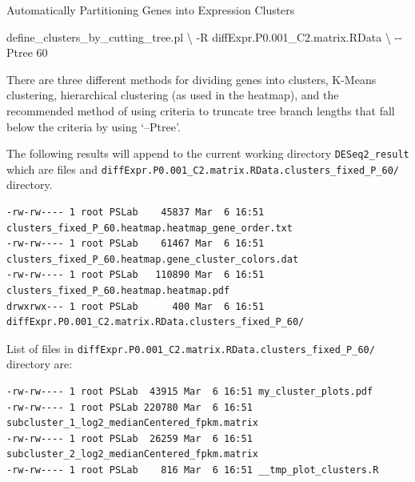 \documentclass[
  letterpaper,
  DIV=11,
  numbers=noendperiod]{scrreprt}
\newenvironment{Shaded}{\begin{snugshade}}{\end{snugshade}}
\newcommand{\DataTypeTok}[1]{\textcolor[rgb]{0.68,0.00,0.00}{#1}}
\newcommand{\ExtensionTok}[1]{\textcolor[rgb]{0.00,0.23,0.31}{#1}}
\newcommand{\NormalTok}[1]{\textcolor[rgb]{0.00,0.23,0.31}{#1}}
\begin{document}
\begin{tcolorbox}[enhanced jigsaw, breakable, bottomrule=.15mm, left=2mm, coltitle=black, opacityback=0, colframe=quarto-callout-note-color-frame, toprule=.15mm, opacitybacktitle=0.6, colbacktitle=quarto-callout-note-color!10!white, bottomtitle=1mm, colback=white, toptitle=1mm, titlerule=0mm, rightrule=.15mm, arc=.35mm, title=\textcolor{quarto-callout-note-color}{\faInfo}\hspace{0.5em}{Activity}, leftrule=.75mm]

Automatically Partitioning Genes into Expression Clusters

\begin{Shaded}
\begin{Highlighting}[]
\ExtensionTok{define\_clusters\_by\_cutting\_tree.pl} \DataTypeTok{\textbackslash{}}
\NormalTok{{-}R diffExpr.P0.001\_C2.matrix.RData }\DataTypeTok{\textbackslash{}}
\NormalTok{{-}{-}Ptree 60}
\end{Highlighting}
\end{Shaded}

\end{tcolorbox}

There are three different methods for dividing genes into clusters,
K-Means clustering, hierarchical clustering (as used in the heatmap),
and the recommended method of using criteria to truncate tree branch
lengths that fall below the criteria by using `--Ptree'.

The following results will append to the current working directory
\texttt{DESeq2\_result} which are files and
\texttt{diffExpr.P0.001\_C2.matrix.RData.clusters\_fixed\_P\_60/}
directory.

\begin{verbatim}
-rw-rw---- 1 root PSLab    45837 Mar  6 16:51 clusters_fixed_P_60.heatmap.heatmap_gene_order.txt
-rw-rw---- 1 root PSLab    61467 Mar  6 16:51 clusters_fixed_P_60.heatmap.gene_cluster_colors.dat
-rw-rw---- 1 root PSLab   110890 Mar  6 16:51 clusters_fixed_P_60.heatmap.heatmap.pdf
drwxrwx--- 1 root PSLab      400 Mar  6 16:51 diffExpr.P0.001_C2.matrix.RData.clusters_fixed_P_60/
\end{verbatim}

List of files in
\texttt{diffExpr.P0.001\_C2.matrix.RData.clusters\_fixed\_P\_60/}
directory are:

\begin{verbatim}
-rw-rw---- 1 root PSLab  43915 Mar  6 16:51 my_cluster_plots.pdf
-rw-rw---- 1 root PSLab 220780 Mar  6 16:51 subcluster_1_log2_medianCentered_fpkm.matrix
-rw-rw---- 1 root PSLab  26259 Mar  6 16:51 subcluster_2_log2_medianCentered_fpkm.matrix
-rw-rw---- 1 root PSLab    816 Mar  6 16:51 __tmp_plot_clusters.R
\end{verbatim}
\end{document}
